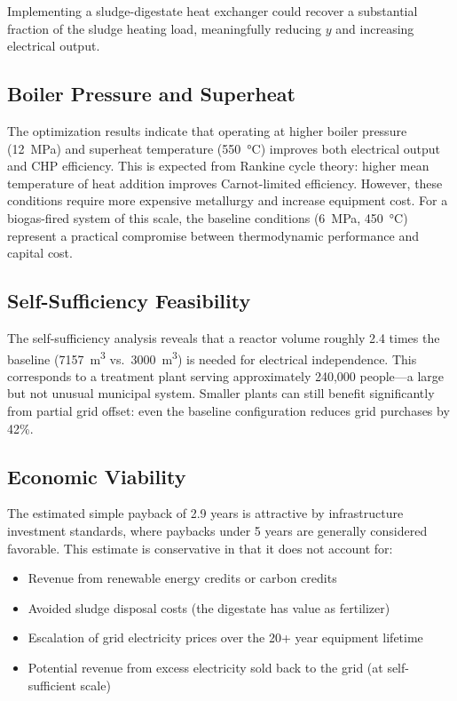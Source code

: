 \documentclass[12pt, letterpaper]{article}
\begin{document}
Implementing a sludge-digestate heat exchanger could recover a substantial fraction of the sludge heating load, meaningfully reducing $y$ and increasing electrical output.

\subsection{Boiler Pressure and Superheat}

The optimization results indicate that operating at higher boiler pressure (\SI{12}{\mega\pascal}) and superheat temperature (\SI{550}{\celsius}) improves both electrical output and CHP efficiency. This is expected from Rankine cycle theory: higher mean temperature of heat addition improves Carnot-limited efficiency. However, these conditions require more expensive metallurgy and increase equipment cost. For a biogas-fired system of this scale, the baseline conditions (\SI{6}{\mega\pascal}, \SI{450}{\celsius}) represent a practical compromise between thermodynamic performance and capital cost.

\subsection{Self-Sufficiency Feasibility}

The self-sufficiency analysis reveals that a reactor volume roughly 2.4 times the baseline (\SI{7157}{\cubic\metre} vs.\ \SI{3000}{\cubic\metre}) is needed for electrical independence. This corresponds to a treatment plant serving approximately 240,000 people---a large but not unusual municipal system. Smaller plants can still benefit significantly from partial grid offset: even the baseline configuration reduces grid purchases by 42\%.

\subsection{Economic Viability}

The estimated simple payback of 2.9 years is attractive by infrastructure investment standards, where paybacks under 5 years are generally considered favorable. This estimate is conservative in that it does not account for:
\begin{itemize}[noitemsep]
  \item Revenue from renewable energy credits or carbon credits
  \item Avoided sludge disposal costs (the digestate has value as fertilizer)
  \item Escalation of grid electricity prices over the 20+ year equipment lifetime
  \item Potential revenue from excess electricity sold back to the grid (at self-sufficient scale)
\end{itemize}
\end{document}

